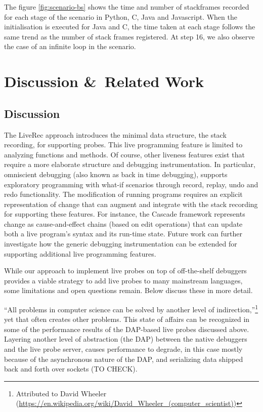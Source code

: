 \documentclass[english,submission]{programming}
\begin{document}
The figure \ref{fig:scenario-bs} shows the time and number of stackframes recorded for each stage of the scenario in Python, C, Java and Javascript. 
When the initialisation is executed for Java and C, the time taken at each stage follows the same trend as the number of stack frames registered. 
At step 16, we also observe the case of an infinite loop in the scenario.


\section{Discussion \&\ Related Work}
\label{sec:related-work}

\subsection{Discussion}

The LiveRec approach introduces the minimal data structure, the stack recording, for supporting probes.
This live programming feature is limited to analyzing functions and methods.
Of course, other liveness features exist that require a more elaborate structure and debugging instrumentation.
In particular, omniscient debugging (also known as back in time debugging), supports exploratory programming with what-if scenarios through record, replay, undo and redo functionality.
The modification of running programs requires an explicit representation of change that can augment and integrate with the stack recording for supporting these features.
For instance, the Cascade framework represents change as cause-and-effect chains (based on edit operations) that can update both a live program's syntax and its run-time state.
Future work can further investigate how the generic debugging instrumentation can be extended for supporting additional live programming features.

While our approach to implement live probes on top of off-the-shelf debuggers provides a viable strategy to add live probes to many mainstream languages, some limitations and open questions remain. Below discuss these in more detail.

``All problems in computer science can be solved by another level of indirection,''\footnote{Attributed to David Wheeler (\url{https://en.wikipedia.org/wiki/David_Wheeler_(computer_scientist)})} yet that often creates other problems. This state of affairs can be recognized in some of the performance results of the DAP-based live probes discussed above. Layering another level of abstraction (the DAP) between the native debuggers and the live probe server, causes performance to degrade, in this case mostly because of the asynchronous nature of the DAP, and serializing data shipped back and forth over sockets (TO CHECK). 
\end{document}
